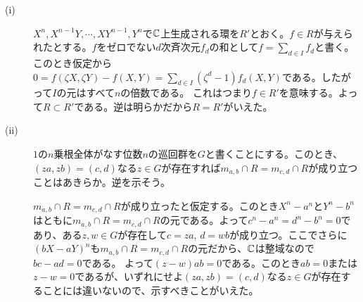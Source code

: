 \newpage

\subsubsection{} %
\begin{sol} ${}$
  \begin{description}
    \item[(i)] $X^n, X^{n-1}Y , \cdots , XY^{n-1}, Y^n$で${\mathbb C}$上生成される環を$R'$とおく。$f \in R$が与えられたとする。$f$をゼロでない$d$次斉次元$f_d$の和として$f = \sum_{d \in I} f_d$と書く。このとき仮定から$0 = f(\zeta X,\zeta Y) - f(X,Y) = \sum_{d \in I} (\zeta^d - 1) f_d(X,Y) $である。したがって$I$の元はすべて$n$の倍数である。
    これはつまり$f \in R'$を意味する。よって$R \subset R'$である。逆は明らかだから$R = R'$がいえた。
    \item[(ii)] $1$の$n$乗根全体がなす位数$n$の巡回群を$G$と書くことにする。このとき、$(z a, z b) = (c,d)$なる$z \in G$が存在すれば$m_{a,b} \cap R = m_{c,d} \cap R$が成り立つことはあきらか。逆を示そう。

    $m_{a,b} \cap R = m_{c,d} \cap R$が成り立ったと仮定する。このとき$X^n - a^n$と$Y^n - b^n$はともに$m_{a,b} \cap R = m_{c,d} \cap R$の元である。よって$c^n - a^n = d^n -b^n = 0$であり、ある$z,w \in G$が存在して$c = za$, $d = wb$が成り立つ。ここでさらに$(bX - aY)^n$も$m_{a,b} \cap R = m_{c,d} \cap R$の元だから、${\mathbb C}$は整域なので$bc - ad=0$である。
    よって$(z - w)ab=0$である。このとき$ab=0$または$z-w=0$であるが、いずれにせよ$(z a, z b) = (c,d)$なる$z \in G$が存在することには違いないので、示すべきことがいえた。
  \end{description}
\end{sol}

\newpage


